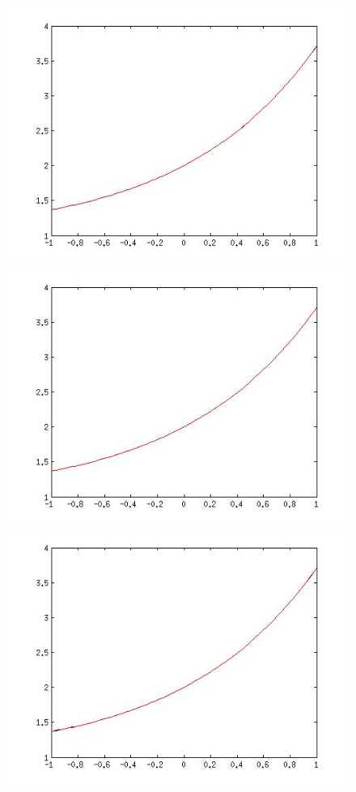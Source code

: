 \begin{enumerate}
\begin{svol}
\begin{figure}[!ht]\begin{center}
\includegraphics[scale=.35]{fig/es6-1a.jpg}
\includegraphics[scale=.35]{fig/es6-1d.jpg}
\includegraphics[scale=.35]{fig/es6-1b.jpg}

\end{center}
\end{figure}
\end{svol}
\end{enumerate}
